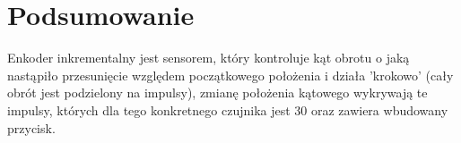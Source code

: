 \documentclass[11pt, a4paper]{article}
\begin{document}



\newpage

\section*{Podsumowanie} 
Enkoder inkrementalny jest sensorem, który kontroluje kąt obrotu o jaką nastąpiło przesunięcie względem początkowego położenia i działa 'krokowo' (cały obrót jest podzielony na impulsy), zmianę położenia kątowego wykrywają te impulsy, których dla tego konkretnego czujnika jest 30 oraz zawiera wbudowany przycisk. 



\printbibliography[heading=bibintoc]
\end{document}
